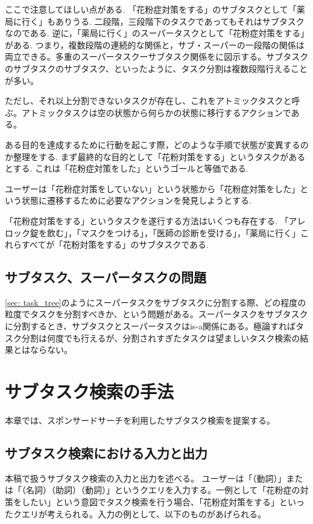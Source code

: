 \documentclass[submit,techreq]{ipsj}
\begin{document}
ここで注意してほしい点がある. 「花粉症対策をする」のサブタスクとして「薬局に行く」もありうる. 二段階，三段階下のタスクであってもそれはサブタスクなのである. 逆に，「薬局に行く」のスーパータスクとして「花粉症対策をする」がある. つまり，複数段階の連続的な関係と，サブ・スーパーの一段階の関係は両立できる。多重のスーパータスクーサブタスク関係をに図示する。サブタスクのサブタスクのサブタスク、といったように、タスク分割は複数段階行えることが多い。

ただし、それ以上分割できないタスクが存在し、これをアトミックタスクと呼ぶ。アトミックタスクは空の状態から何らかの状態に移行するアクションである。


ある目的を達成するために行動を起こす際，どのような手順で状態が変異するのか整理をする. まず最終的な目的として「花粉対策をする」というタスクがあるとする. これは「花粉症対策をした」というゴールと等価である.

ユーザーは「花粉症対策をしていない」という状態から「花粉症対策をした」という状態に遷移するために必要なアクションを発見しようとする.

「花粉症対策をする」というタスクを遂行する方法はいくつも存在する. 「アレロック錠を飲む」，「マスクをつける」，「医師の診断を受ける」，「薬局に行く」これらすべてが「花粉対策をする」のサブタスクである.

\subsection{サブタスク、スーパータスクの問題}
\ref{sec: task_tree}のようにスーパータスクをサブタスクに分割する際、どの程度の粒度でタスクを分割すべきか、という問題がある。スーパータスクをサブタスクに分割するとき、サブタスクとスーパータスクはis-a関係にある。極論すればタスク分割は何度でも行えるが、分割されすぎたタスクは望ましいタスク検索の結果とはならない。


\section{サブタスク検索の手法}
本章では、スポンサードサーチを利用したサブタスク検索を提案する。

\subsection{サブタスク検索における入力と出力}
本稿で扱うサブタスク検索の入力と出力を述べる。
ユーザーは「（動詞）」または「（名詞）（助詞）（動詞）」というクエリを入力する。一例として「花粉症の対策をしたい」という意図でタスク検索を行う場合、「花粉症対策をする」といったクエリが考えられる。入力の例として、以下のものがあげられる。
\end{document}

